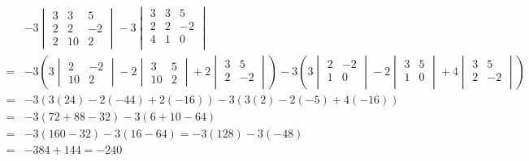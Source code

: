 \documentclass{article}
\begin{document}
\begin{itemize}
\begin{align*}
& -3\begin{vmatrix}
3 &   3 &  5 \\ 
2 &   2 & -2 \\ 
2 & 10 &  2
\end{vmatrix} - 3\begin{vmatrix}
3 & 3 &  5 \\ 
2 & 2 & -2 \\ 
4 & 1 &  0 \\ 
\end{vmatrix} 
\\
= & -3\left(3\begin{vmatrix}
2 & -2 \\ 
10 & 2
\end{vmatrix} - 2\begin{vmatrix}
3 & 5 \\ 
10 & 2
\end{vmatrix} + 2\begin{vmatrix}
3 &  5 \\ 
2 & -2 \\ 
\end{vmatrix}\right) 
- 3\left(3\begin{vmatrix}
2 & -2 \\ 
1 &  0 \\ 
\end{vmatrix} - 2\begin{vmatrix}
3 & 5 \\ 
1 & 0 \\ 
\end{vmatrix} + 4\begin{vmatrix}
3 &  5 \\ 
2 & -2 \\ 
\end{vmatrix}\right) 
\\
= & -3(3(24) - 2(-44) + 2(-16)) - 3(3(2) - 2(-5) + 4(-16)) \\
= & -3(72 + 88 - 32) - 3(6 + 10 - 64) \\
= & -3(160 - 32) - 3(16 - 64) 
= -3(128) - 3(-48) \\
= & -384 + 144 
= -240
\end{align*} 

\end{itemize}
\end{document}
